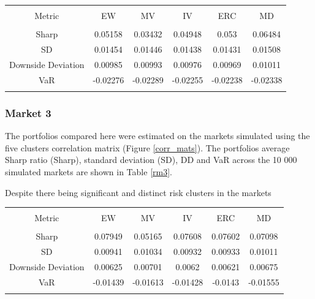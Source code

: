 \documentclass[11pt,preprint, authoryear]{elsarticle}
\let\origtable\table
\let\endorigtable\endtable
\renewenvironment{table}[1][2] {
    \expandafter\origtable\expandafter[H]
} {
    \endorigtable
}
\numberwithin{equation}{section}
\numberwithin{figure}{section}
\numberwithin{table}{section}
\begin{document}
\begin{table}[!htbp] \centering 
  \caption{Market 2 - Portfolio Risk Metrics} 
  \label{rm2} 
\begin{tabular}{@{\extracolsep{5pt}} cccccc} 
\\[-1.8ex]\hline 
\hline \\[-1.8ex] 
Metric & EW & MV & IV & ERC & MD \\ 
\hline \\[-1.8ex] 
Sharp & 0.05158 & 0.03432 & 0.04948 & 0.053 & 0.06484 \\ 
SD & 0.01454 & 0.01446 & 0.01438 & 0.01431 & 0.01508 \\ 
Downside Deviation & 0.00985 & 0.00993 & 0.00976 & 0.00969 & 0.01011 \\ 
VaR & -0.02276 & -0.02289 & -0.02255 & -0.02238 & -0.02338 \\ 
\hline \\[-1.8ex] 
\end{tabular} 
\end{table}

\hypertarget{market-3}{%
\subsubsection{Market 3}\label{market-3}}

The portfolios compared here were estimated on the markets simulated
using the five clusters correlation matrix (Figure \ref{corr_mats}). The
portfolios average Sharp ratio (Sharp), standard deviation (SD), DD and
VaR across the 10 000 simulated markets are shown in Table \ref{rm3}.

Despite there being significant and distinct risk clusters in the
markets

\begin{table}[!htbp] \centering 
  \caption{Market 3 Risk Metrics} 
  \label{rm3} 
\begin{tabular}{@{\extracolsep{5pt}} cccccc} 
\\[-1.8ex]\hline 
\hline \\[-1.8ex] 
Metric & EW & MV & IV & ERC & MD \\ 
\hline \\[-1.8ex] 
Sharp & 0.07949 & 0.05165 & 0.07608 & 0.07602 & 0.07098 \\ 
SD & 0.00941 & 0.01034 & 0.00932 & 0.00933 & 0.01011 \\ 
Downside Deviation & 0.00625 & 0.00701 & 0.0062 & 0.00621 & 0.00675 \\ 
VaR & -0.01439 & -0.01613 & -0.01428 & -0.0143 & -0.01555 \\ 
\hline \\[-1.8ex] 
\end{tabular} 
\end{table}
\end{document}
